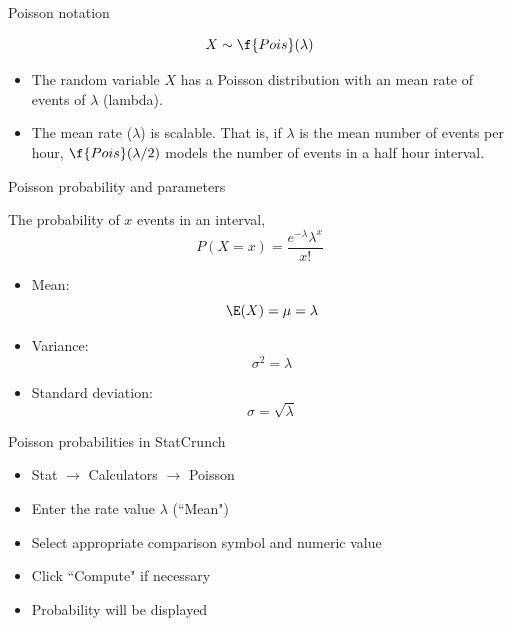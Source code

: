 \documentclass[xcolor=table]{beamer}
\begin{document}
\begin{frame}{Poisson notation}
\begin{block}{}
\[X \sim \f{Pois}(\lambda)\]
\begin{itemize}
\pause\item The random variable $X$ has a Poisson distribution with an mean rate of events of $\lambda$ (lambda).
\pause\item The mean rate ($\lambda$) is scalable. That is, if $\lambda$ is the mean number of events per hour, $\f{Pois}(\lambda/2)$ models the number of events in a half hour interval.
\end{itemize}
\end{block}
\end{frame}

\begin{frame}{Poisson probability and parameters}
\begin{block}{}
The probability of $x$ events in an interval,
\[P(X=x) = \frac{e^{-\lambda}\lambda^x}{x!}\]
\begin{itemize}
\vspace*{-\baselineskip}\pause\item Mean: \[\E(X) = \mu = \lambda\]
\vspace*{-\baselineskip}\pause\item Variance: \[\sigma^2 = \lambda\]
\vspace*{-\baselineskip}\pause\item Standard deviation: \[\sigma = \sqrt \lambda \]
\end{itemize}
\end{block}
\end{frame}

\begin{frame}{Poisson probabilities in StatCrunch}
\begin{block}{}
\begin{itemize}
\item Stat $\to$ Calculators $\to$ Poisson
\item Enter the rate value $\lambda$ (``Mean")
\item Select appropriate comparison symbol and numeric value
\item Click ``Compute" if necessary
\item Probability will be displayed
\end{itemize}
\end{block}
\end{frame}
\end{document}
